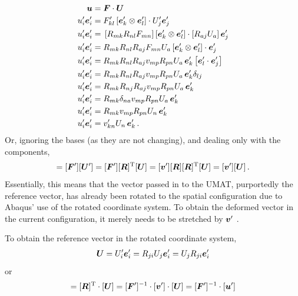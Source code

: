 \documentclass[10pt,letterpaper,oneside]{report}
\newcommand{\ten}[1]{\mbox{\boldmath $#1$}{}}
\newcommand{\scas}[1]{\mbox{{\scriptsize{${\rm{#1}}$}}}{}}
\begin{document}
\begin{align}
\ten{u} ={}& \ten{F} \cdot \ten{U} 
\\
u'_i \ten{e}'_i ={}& F'_{kl} \left[ \ten{e}'_k \otimes \ten{e}'_l \right] \cdot U'_j \ten{e}'_j 
\notag \\
u'_i \ten{e}'_i ={}& \left[ R_{mk} R_{nl} F_{mn} \right] \left[ \ten{e}'_k \otimes \ten{e}'_l \right] \cdot \left[ R_{aj} U_a \right] \ten{e}'_j 
\notag \\
u'_i \ten{e}'_i ={}& R_{mk} R_{nl} R_{aj} F_{mn} U_a \left[ \ten{e}'_k \otimes \ten{e}'_l \right] \cdot \ten{e}'_j 
\notag \\
u'_i \ten{e}'_i ={}& R_{mk} R_{nl} R_{aj} v_{mp} R_{pn} U_a \, \ten{e}'_k \left[ \ten{e}'_l \cdot \ten{e}'_j \right] 
\notag \\
u'_i \ten{e}'_i ={}& R_{mk} R_{nl} R_{aj} v_{mp} R_{pn} U_a \, \ten{e}'_k \delta_{lj} 
\notag \\
u'_i \ten{e}'_i ={}& R_{mk} R_{nj} R_{aj} v_{mp} R_{pn} U_a \, \ten{e}'_k 
\notag \\
u'_i \ten{e}'_i ={}& R_{mk} \delta_{na} v_{mp} R_{pn} U_a \, \ten{e}'_k 
\notag \\
u'_i \ten{e}'_i ={}& R_{mk} v_{mp} R_{pn} U_n \, \ten{e}'_k 
\notag \\
u'_i \ten{e}'_i ={}& v'_{kn} U_n \, \ten{e}'_k \, .
\end{align}
Or, ignoring the bases (as they are not changing), and dealing only with the components,
\begin{align}
[ \ten{u}' ] = [ \ten{F}' ] [ \ten{U}' ] = [ \ten{F}' ] [ \ten{R} ]^{\scas{T}} [ \ten{U} ] = [ \ten{v}' ] [ \ten{R} ] [ \ten{R} ]^{\scas{T}} [ \ten{U} ] = [ \ten{v}' ] [ \ten{U} ] \, .
\end{align}
Essentially, this means that the vector passed in to the UMAT, purportedly the reference vector, has already been rotated to the spatial configuration due to Abaqus' use of the rotated coordinate system.  To obtain the deformed vector in the current configuration, it merely needs to be stretched by $\ten{v}'$ \autocite{SahliCostabal2017}.  

To obtain the reference vector in the rotated coordinate system,
\begin{align}
\ten{U} = U'_i \ten{e}'_i = R_{ji} U_j \ten{e}'_i = U_j R_{ji} \ten{e}'_i 
\end{align}
or
\begin{align}
[ \ten{U}' ] = [ \ten{R} ]^{\scas{T}} \cdot [ \ten{U} ] = [ \ten{F}' ]^{-1} \cdot [ \ten{v}' ] \cdot [ \ten{U} ] = [ \ten{F}' ]^{-1} \cdot [ \ten{u}' ] 
\end{align}
\end{document}
